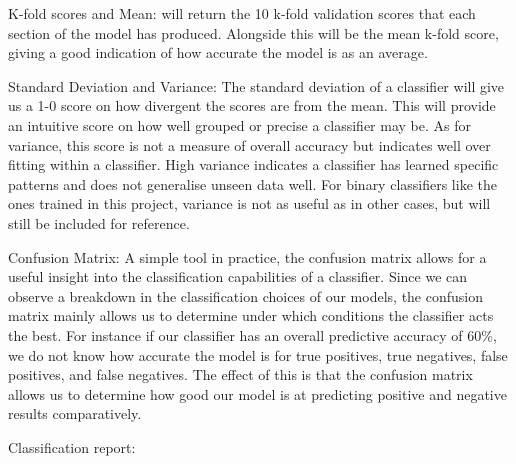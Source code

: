 \documentclass[11pt, a4paper]{article}
\begin{document}
K-fold scores and Mean: will return the 10 k-fold validation scores that each section of the model has produced. Alongside this will be the mean k-fold score, giving a good indication of how accurate the model is as an average.

Standard Deviation and Variance: The standard deviation of a classifier will give us a 1-0 score on how divergent the scores are from the mean. This will provide an intuitive score on how well grouped or precise a classifier may be. As for variance, this score is not a measure of overall accuracy but indicates well over fitting within a classifier. High variance indicates a classifier has learned specific patterns and does not generalise unseen data well. For binary classifiers like the ones trained in this project, variance is not as useful as in other cases, but will still be included for reference.

Confusion Matrix:
A simple tool in practice, the confusion matrix allows for a useful insight into the classification capabilities of a classifier. Since we can observe a breakdown in the classification choices of our models, the confusion matrix mainly allows us to determine under which conditions the classifier acts the best. For instance if our classifier has an overall predictive accuracy of 60\%, we do not know how accurate the model is for true positives, true negatives, false positives, and false negatives. The effect of this is that the confusion matrix allows us to determine how good our model is at predicting positive and negative results comparatively.

Classification report:
\end{document}
